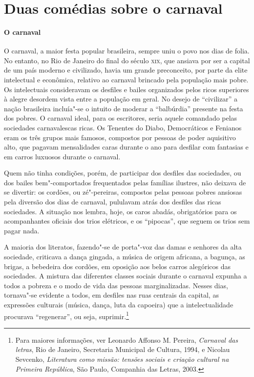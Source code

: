 \section{Duas comédias sobre o carnaval}

\paragraph{O carnaval}

O carnaval, a maior festa popular brasileira, sempre uniu o povo nos
dias de folia. No entanto, no Rio de Janeiro do final do século \textsc{xix},
que ansiava por ser a capital de um país moderno e civilizado, havia um
grande preconceito, por parte da elite intelectual e econômica,
relativo ao carnaval brincado pela população mais pobre. Os
intelectuais consideravam os desfiles e bailes organizados pelos ricos
superiores à alegre desordem vista entre a população em geral. No
desejo de “civilizar” a nação brasileira incluía"-se o intuito de
moderar a “balbúrdia” presente na festa dos pobres. O carnaval ideal,
para os escritores, seria aquele comandado pelas sociedades
carnavalescas ricas. Os Tenentes do Diabo, Democráticos e Fenianos eram
os três grupos mais famosos, compostos por pessoas de poder aquisitivo
alto, que pagavam mensalidades caras durante o ano para desfilar com
fantasias e em carros luxuosos durante o carnaval.

Quem não tinha condições, porém, de participar dos desfiles das
sociedades, ou dos bailes bem"-comportados frequentados pelas famílias
ilustres, não deixava de se divertir: os cordões, ou zé"-pereiras,
compostos pelas pessoas pobres ansiosas pela diversão dos dias de
carnaval, pululavam atrás dos desfiles das ricas sociedades. A situação
nos lembra, hoje, os caros abadás, obrigatórios para os acompanhantes
oficiais dos trios elétricos, e os “pipocas”, que seguem os trios sem
pagar nada. 

A maioria dos literatos, fazendo"-se de porta"-voz das damas e senhores da
alta sociedade, criticava a dança gingada, a música de origem africana,
a bagunça, as brigas, a bebedeira dos cordões, em oposição aos belos
carros alegóricos das sociedades. A mistura das diferentes classes
sociais durante o carnaval expunha a todos a pobreza e o modo de vida
das pessoas marginalizadas. Nesses dias, tornava"-se evidente a todos,
em desfiles nas ruas centrais da capital, as expressões culturais
(música, dança, luta da capoeira) que a intelectualidade procurava
“regenerar”, ou seja, suprimir.\footnote{ Para maiores informações, ver Leonardo Affonso M. Pereira, \textit{Carnaval
das letras}, Rio de Janeiro, Secretaria Municipal de Cultura, 1994, e Nicolau Sevcenko, \textit{Literatura como missão:
tensões sociais e criação cultural na Primeira República}, São Paulo, Companhia das Letras, 2003.}

